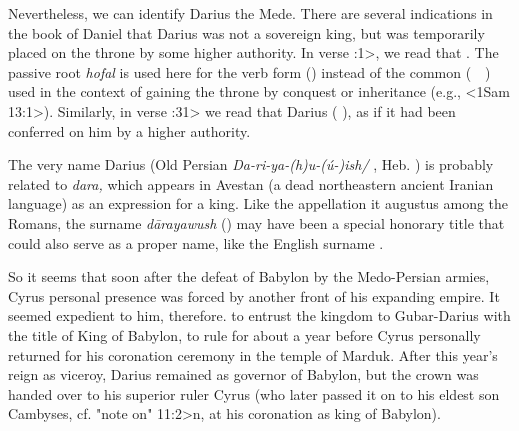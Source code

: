 Nevertheless, we can identify Darius the Mede.
There are several indications in the book of Daniel that Darius was not a sovereign king, but was temporarily placed on the throne by some higher authority.
In verse :1>, we read that . The passive root {{\it hofal\/}} is used here for the verb form  (\Homlak) instead of the common  (\Malak \ \ ) used in the context of gaining the throne by conquest or inheritance (e.g., <1Sam 13:1>).
Similarly, in verse :31> we read that Darius  ( \Qabbel), as if it had been conferred on him by a higher authority.

The very name Darius (Old Persian {\it Da-ri-ya-(h)u-(ú-)ish/} \Dariahuuish, Heb. \Dariawush) is probably related to {\it dara,\/} which appears in Avestan (a dead northeastern ancient Iranian language) as an expression for a king.
Like the appellation {{it augustus}} among the Romans, the surname {{\it dārayawush\/}} () may have been a special honorary title that
could also serve as a proper name, like the English surname .

%
%
So it seems that soon after the defeat of Babylon by the Medo-Persian armies, Cyrus personal presence was forced by another front of his expanding empire. It seemed expedient to him, therefore.
to entrust the kingdom to Gubar-Darius with the title of King of Babylon, to rule for about a year before Cyrus personally returned for his coronation ceremony in the temple of Marduk.
After this year's reign as viceroy, Darius remained as governor of Babylon, but the crown was handed over to his superior ruler Cyrus (who later passed it on to his eldest son Cambyses, cf. \<"note on" 11:2>n, at his coronation as king of Babylon).


